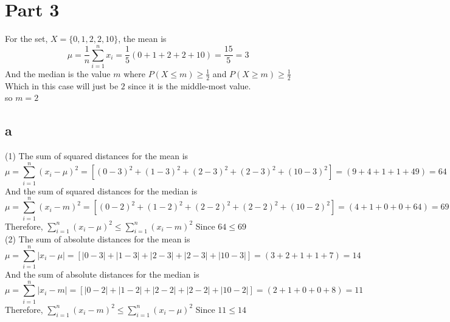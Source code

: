 \documentclass{article}
\begin{document}


\newpage

\section{Part 3}
For the set, $X=\{0,1,2,2,10\}$, the mean is
\begin{equation*}
  \mu=\frac{1}{n}\sum_{i=1}^{n}x_i
  =\frac{1}{5}(0+1+2+2+10)
  =\frac{15}{5}
  =3
\end{equation*}
And the median is the value $m$ where
$P(X\leq m)\geq\frac{1}{2}$ and $P(X\geq m)\geq\frac{1}{2}$
Which in this case will just be $2$ since it is the middle-most value. \\
so $m=2$

\subsection{a}
(1)
The sum of squared distances for the mean is
\begin{equation*}
  \mu=\sum_{i=1}^{n}(x_i-\mu)^2
  =[(0-3)^2+(1-3)^2+(2-3)^2+(2-3)^2+(10-3)^2]
  =(9+4+1+1+49)
  =64
\end{equation*}
And the sum of squared distances for the median is
\begin{equation*}
  \mu=\sum_{i=1}^{n}(x_i-m)^2
  =[(0-2)^2+(1-2)^2+(2-2)^2+(2-2)^2+(10-2)^2]
  =(4+1+0+0+64)
  =69
\end{equation*}
Therefore,
$\sum_{i=1}^{n}(x_i-\mu)^2 \le \sum_{i=1}^{n}(x_i-m)^2$
Since $64 \le 69$ \\

(2)
The sum of absolute distances for the mean is
\begin{equation*}
  \mu=\sum_{i=1}^{n}|x_i-\mu|
  =[|0-3|+|1-3|+|2-3|+|2-3|+|10-3|]
  =(3+2+1+1+7)
  =14
\end{equation*}
And the sum of absolute distances for the median is
\begin{equation*}
  \mu=\sum_{i=1}^{n}|x_i-m|
  =[|0-2|+|1-2|+|2-2|+|2-2|+|10-2|]
  =(2+1+0+0+8)
  =11
\end{equation*}
Therefore,
$\sum_{i=1}^{n}(x_i-m)^2 \le \sum_{i=1}^{n}(x_i-\mu)^2$
Since $11 \le 14$
\end{document}
